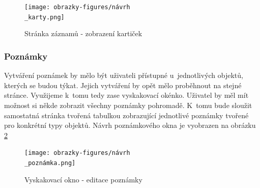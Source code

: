 \begin{figure}[H]
	\centering
	\texttt{[image: obrazky-figures/návrh\\\_karty.png]}
	\caption[Návrh stránky záznamů]{Stránka záznamů - zobrazení kartiček}
	\label{figure_záznamy}
\end{figure}

\subsubsection{Poznámky}

Vytváření poznámek by mělo být uživateli přístupné u~jednotlivých objektů, kterých se budou týkat. Jejich vytváření by opět mělo proběhnout na stejné stránce. Využijeme k~tomu tedy zase vyskakovací okénko. Uživatel by měl mít možnost si někde zobrazit všechny poznámky pohromadě. K~tomu bude sloužit samostatná stránka tvořená tabulkou zobrazující jednotlivé poznámky tvořené pro konkrétní typy objektů. Návrh poznámkového okna je vyobrazen na obrázku \ref{figure_poznámka}

\begin{figure}[H]
	\centering
	\texttt{[image: obrazky-figures/návrh\\\_poznámka.png]}
	\caption[Návrh okna poznámky]{Vyskakovací okno - editace poznámky}
	\label{figure_poznámka}
\end{figure}